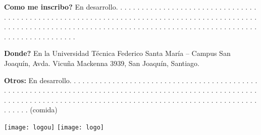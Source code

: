 \documentclass[12pt,letterpaper]{article}
\begin{document}
\begin{large}
\textbf{Como me inscribo?} En desarrollo. . . . . . . . . . . . . . . . . . . . . . . . . . . . . . . . . . . . . . . . . . . . . . . . . . . . . . . . . . . . . . . . . . . . . . . . . . . . . . . . . . . . . . . . . . . . . . . . . . . . . . . . . . . . . . . . . . . . . . . . . . . . . . . . . . . . . . . . . . . . . . . . . . . . . . . . . . . . . . . . . . . . . . . . \par

\textbf{Donde?} En la Universidad Técnica Federico Santa María -- Campus San Joaquín, Avda. Vicuña Mackenna 3939, San Joaquín, Santiago.\par

\textbf{Otros:} En desarrollo. . . . . . . . . . . . . . . . . . . . . . . . . . . . . . . . . . . . . . . . . . . . . . . . . . . . . . . . . . . . . . . . . . . . . . . . . . . . . . . . . . . . . . . . . . . . . . . . . . . . . . . . . . . . . . . . . . . . . . . . . . . . . . . . . . . . . . . . . . . . . . . . . . . . . . . . . . . . . . . . . . . . . . . .  (comida)\par
\end{large}

\vfill
\texttt{[image: logou]}
\hfill
\texttt{[image: logo]}
\end{document}
